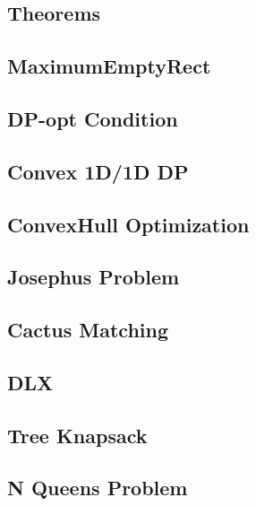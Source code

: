 \documentclass[a4paper,10pt,twocolumn,oneside]{article}
\begin{document}
\subsection{Theorems}

\subsection{MaximumEmptyRect}

\subsection{DP-opt Condition}

\subsection{Convex 1D/1D DP}

\subsection{ConvexHull Optimization}

\subsection{Josephus Problem}

\subsection{Cactus Matching}

\subsection{DLX}

\subsection{Tree Knapsack}

\subsection{N Queens Problem}

\end{document}
